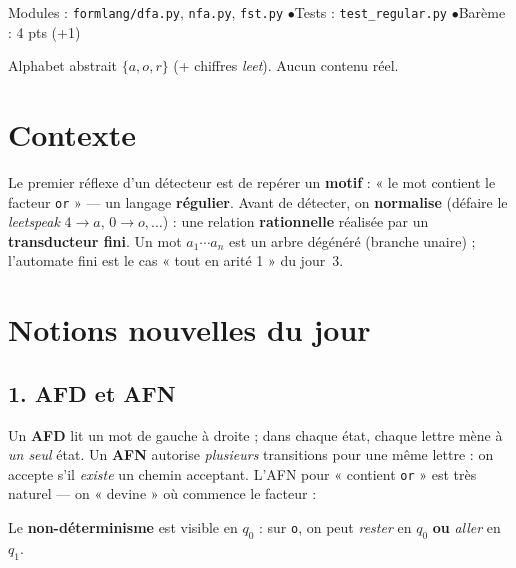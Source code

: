 \documentclass[11pt,a4paper]{scrartcl}
\begin{document}
{Modules : \texttt{formlang/dfa.py}, \texttt{nfa.py}, \texttt{fst.py} \quad$\bullet$\quad Tests : \texttt{test\_regular.py} \quad$\bullet$\quad Barème : 4 pts (+1)}

\begin{ethique}
Alphabet abstrait $\{a,o,r\}$ (+ chiffres \emph{leet}). Aucun contenu réel.
\end{ethique}

\section*{Contexte}
Le premier réflexe d'un détecteur est de repérer un \textbf{motif} : « le mot contient
le facteur \texttt{or} » — un langage \textbf{régulier}. Avant de détecter, on
\textbf{normalise} (défaire le \emph{leetspeak} $4\!\to\!a,\,0\!\to\!o,\dots$) : une
relation \textbf{rationnelle} réalisée par un \textbf{transducteur fini}. Un mot
$a_1\cdots a_n$ est un arbre dégénéré (branche unaire) ; l'automate fini est le cas
« tout en arité 1 » du jour~3.

\section*{Notions nouvelles du jour}

\subsection*{1. AFD et AFN}
Un \textbf{AFD} lit un mot de gauche à droite ; dans chaque état, chaque lettre mène à
\emph{un seul} état. Un \textbf{AFN} autorise \emph{plusieurs} transitions pour une même
lettre : on accepte s'il \emph{existe} un chemin acceptant. L'AFN pour « contient
\texttt{or} » est très naturel — on « devine » où commence le facteur :

\begin{center}
\end{center}
\noindent Le \textbf{non-déterminisme} est visible en $q_0$ : sur \texttt{o}, on peut
\emph{rester} en $q_0$ \textbf{ou} \emph{aller} en $q_1$.
\end{document}
